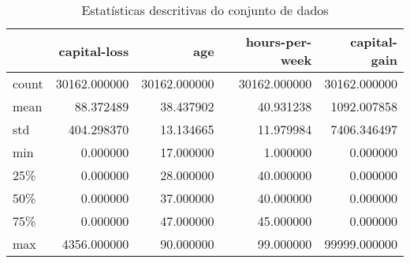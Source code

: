 \begin{table}
\centering
\caption{Estatísticas descritivas do conjunto de dados}
\label{tbl:descriptive_statistics}
\begin{tabular}{lrrrr}
\toprule
{} &  capital-loss &           age &  hours-per-week &  capital-gain \\
\midrule
count &  30162.000000 &  30162.000000 &    30162.000000 &  30162.000000 \\
mean  &     88.372489 &     38.437902 &       40.931238 &   1092.007858 \\
std   &    404.298370 &     13.134665 &       11.979984 &   7406.346497 \\
min   &      0.000000 &     17.000000 &        1.000000 &      0.000000 \\
25\%   &      0.000000 &     28.000000 &       40.000000 &      0.000000 \\
50\%   &      0.000000 &     37.000000 &       40.000000 &      0.000000 \\
75\%   &      0.000000 &     47.000000 &       45.000000 &      0.000000 \\
max   &   4356.000000 &     90.000000 &       99.000000 &  99999.000000 \\
\bottomrule
\end{tabular}
\end{table}
